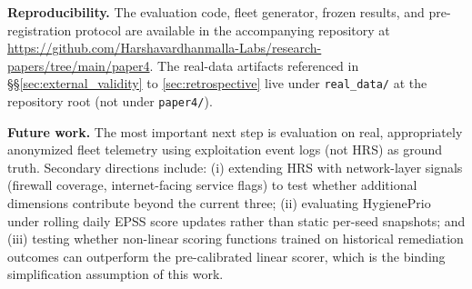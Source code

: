 \textbf{Reproducibility.} The evaluation code, fleet generator, frozen results, and pre-registration protocol are available in the accompanying repository at \url{https://github.com/Harshavardhanmalla-Labs/research-papers/tree/main/paper4}. The real-data artifacts referenced in \S\S\ref{sec:external_validity} to \ref{sec:retrospective} live under \texttt{real\_data/} at the repository root (not under \texttt{paper4/}).

\textbf{Future work.} The most important next step is evaluation on real, appropriately anonymized fleet telemetry using exploitation event logs (not HRS) as ground truth. Secondary directions include: (i) extending HRS with network-layer signals (firewall coverage, internet-facing service flags) to test whether additional dimensions contribute beyond the current three; (ii) evaluating HygienePrio under rolling daily EPSS score updates rather than static per-seed snapshots; and (iii) testing whether non-linear scoring functions trained on historical remediation outcomes can outperform the pre-calibrated linear scorer, which is the binding simplification assumption of this work.
